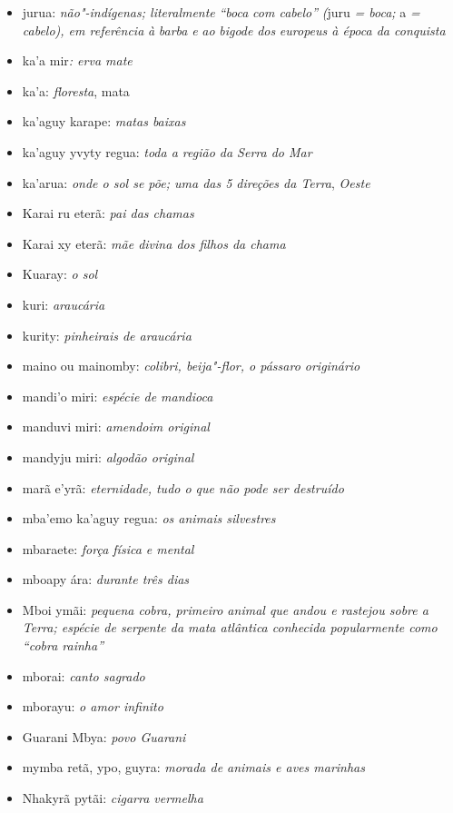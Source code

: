 \begin{itemize}
\item
  jurua: \emph{não"-indígenas; literalmente} \emph{``boca} \emph{com
  cabelo''} \emph{(}juru \emph{= boca;} a \emph{=} \emph{cabelo), em
  referência} \emph{à} \emph{barba} \emph{e} \emph{ao} \emph{bigode} \emph{dos} \emph{europeus
  à época da conquista} 
\item
  ka'a mir\emph{: erva mate}
\item
  ka'a: \emph{floresta}, mata
\item
  ka'aguy karape: \emph{matas baixas}
\item
  ka'aguy yvyty regua: \emph{toda a região da Serra do Mar} 
\item
  ka'arua: \emph{onde o sol se põe; uma das 5 direções da Terra},
  \emph{Oeste} 
\item
  Karai ru eterã: \emph{pai das chamas}
\item
  Karai xy eterã: \emph{mãe divina dos filhos da chama}
\item
  Kuaray: \emph{o sol}
\item
  kuri: \emph{araucária}
\item
  kurity: \emph{pinheirais de araucária}
\item
  maino ou mainomby: \emph{colibri, beija"-flor, o pássaro originário}
\item
  mandi'o miri: \emph{espécie de mandioca}
\item
  manduvi miri: \emph{amendoim original}
\item
  mandyju miri: \emph{algodão original}
\item
  marã e'yrã: \emph{eternidade, tudo o que não pode ser destruído}
\item
  mba'emo ka'aguy regua: \emph{os animais silvestres}
\item
  mbaraete: \emph{força física e mental}
\item
  mboapy ára: \emph{durante três dias}
\item
  Mboi ymãi: \emph{pequena cobra, primeiro animal que andou e rastejou
  sobre a Terra; espécie de serpente da mata atlântica conhecida
  popularmente como ``cobra rainha''}
\item
  mborai: \emph{canto sagrado}
\item
  mborayu: \emph{o amor infinito}
\item
  Guarani Mbya: \emph{povo Guarani}
\item
  mymba retã, ypo, guyra: \emph{morada de animais e aves marinhas}
\item
  Nhakyrã pytãi: \emph{cigarra vermelha}

\end{itemize}
